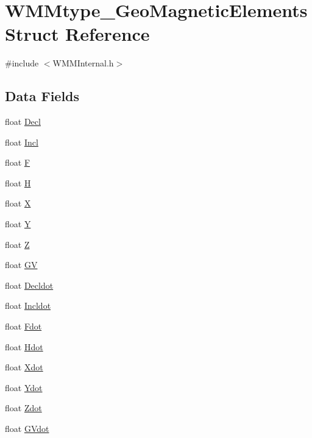 \hypertarget{struct_w_m_mtype___geo_magnetic_elements}{\section{\-W\-M\-Mtype\-\_\-\-Geo\-Magnetic\-Elements \-Struct \-Reference}
\label{struct_w_m_mtype___geo_magnetic_elements}
}


{\ttfamily \#include $<$\-W\-M\-M\-Internal.\-h$>$}

\subsection*{\-Data \-Fields}
\begin{DoxyCompactItemize}
\item 
float \hyperlink{struct_w_m_mtype___geo_magnetic_elements_a9a93785970d529cbca6172d59ca0d225}{\-Decl}
\item 
float \hyperlink{struct_w_m_mtype___geo_magnetic_elements_a7457bb44f79e87703e2c83bab3c71ae9}{\-Incl}
\item 
float \hyperlink{struct_w_m_mtype___geo_magnetic_elements_af97c7b8926ffd4d694c4292916c2c153}{\-F}
\item 
float \hyperlink{struct_w_m_mtype___geo_magnetic_elements_ae3c575b310c43b133f83cf6bd3b14cfe}{\-H}
\item 
float \hyperlink{struct_w_m_mtype___geo_magnetic_elements_af81004bb2f8cd436246b1b4240d1acc9}{\-X}
\item 
float \hyperlink{struct_w_m_mtype___geo_magnetic_elements_af6f78344def47740cd5ce0196189ce32}{\-Y}
\item 
float \hyperlink{struct_w_m_mtype___geo_magnetic_elements_adb133f24b128e0dcd3ad2b219d2c42e5}{\-Z}
\item 
float \hyperlink{struct_w_m_mtype___geo_magnetic_elements_aa1d50824f5887167ee93d075222f9deb}{\-G\-V}
\item 
float \hyperlink{struct_w_m_mtype___geo_magnetic_elements_a6c23bd42050e02810a937cd0316b9d8e}{\-Decldot}
\item 
float \hyperlink{struct_w_m_mtype___geo_magnetic_elements_aac0feb3987db9841acd278f27f0726c7}{\-Incldot}
\item 
float \hyperlink{struct_w_m_mtype___geo_magnetic_elements_aaff92c0324d3a717abc215245cbd5238}{\-Fdot}
\item 
float \hyperlink{struct_w_m_mtype___geo_magnetic_elements_aa1e42deb6458e019df1619c0fec2ba3c}{\-Hdot}
\item 
float \hyperlink{struct_w_m_mtype___geo_magnetic_elements_a58fb30f1b03a7cace00a55fb28f6752f}{\-Xdot}
\item 
float \hyperlink{struct_w_m_mtype___geo_magnetic_elements_a2290a6a91702f831acd13dc8433c816a}{\-Ydot}
\item 
float \hyperlink{struct_w_m_mtype___geo_magnetic_elements_a094afb05e04f6d9654a1a469987600a6}{\-Zdot}
\item 
float \hyperlink{struct_w_m_mtype___geo_magnetic_elements_ab653a08b7f24f25dd253ff9f16f3b01e}{\-G\-Vdot}
\end{DoxyCompactItemize}


